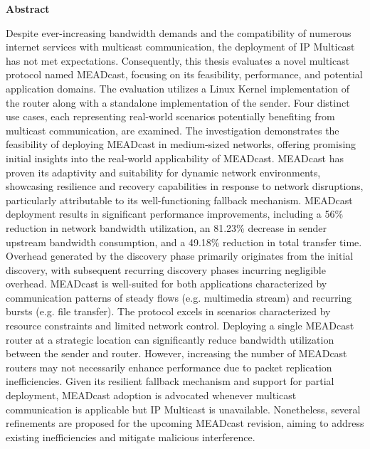 \vspace*{2cm}

\begin{center}
    \textbf{Abstract}
\end{center}

\vspace*{1cm}
\noindent
Despite ever-increasing bandwidth demands and the compatibility of numerous
    internet services with multicast communication, the deployment of IP
    Multicast has not met expectations.
Consequently, this thesis evaluates a novel multicast protocol named MEADcast,
    focusing on its feasibility, performance, and potential application domains.
The evaluation utilizes a Linux Kernel implementation of the router along
    with a standalone implementation of the sender.
Four distinct use cases, each representing real-world scenarios potentially
    benefiting from multicast communication, are examined.
The investigation demonstrates the feasibility of deploying MEADcast in
    medium-sized networks, offering promising initial insights into the
    real-world applicability of MEADcast.
MEADcast has proven its adaptivity and suitability for dynamic network
    environments, showcasing resilience and recovery capabilities in response
    to network disruptions, particularly attributable to its well-functioning
    fallback mechanism.
MEADcast deployment results in significant performance improvements, including
    a 56\% reduction in network bandwidth utilization, an 81.23\% decrease in
    sender upstream bandwidth consumption, and a 49.18\% reduction in total
    transfer time.
Overhead generated by the discovery phase primarily originates from the initial
    discovery, with subsequent recurring discovery phases incurring negligible
    overhead.
MEADcast is well-suited for both applications characterized by communication
    patterns of steady flows (e.g. multimedia stream) and recurring bursts
    (e.g. file transfer).
The protocol excels in scenarios characterized by resource constraints and
    limited network control.
Deploying a single MEADcast router at a strategic location can significantly
    reduce bandwidth utilization between the sender and router.
However, increasing the number of MEADcast routers may not necessarily enhance
    performance due to packet replication inefficiencies.
Given its resilient fallback mechanism and support for partial deployment,
    MEADcast adoption is advocated whenever multicast communication is
    applicable but IP Multicast is unavailable.
Nonetheless, several refinements are proposed for the upcoming MEADcast
    revision, aiming to address existing inefficiencies and mitigate malicious
    interference.
